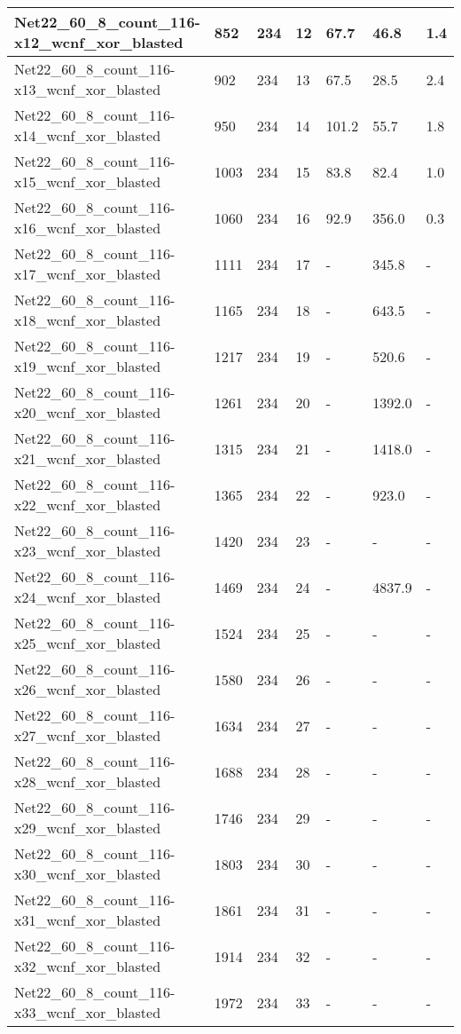 \begin{scriptsize}
\begin{longtable}{|p{5cm}|l|l|l|l|l|l|}
Net22\_60\_8\_count\_116-x12\_wcnf\_xor\_blasted&852&234&12&67.7&46.8&1.4 \\ \hline 
Net22\_60\_8\_count\_116-x13\_wcnf\_xor\_blasted&902&234&13&67.5&28.5&2.4 \\ \hline 
Net22\_60\_8\_count\_116-x14\_wcnf\_xor\_blasted&950&234&14&101.2&55.7&1.8 \\ \hline 
Net22\_60\_8\_count\_116-x15\_wcnf\_xor\_blasted&1003&234&15&83.8&82.4&1.0 \\ \hline 
Net22\_60\_8\_count\_116-x16\_wcnf\_xor\_blasted&1060&234&16&92.9&356.0&0.3 \\ \hline 
Net22\_60\_8\_count\_116-x17\_wcnf\_xor\_blasted&1111&234&17&-&345.8&- \\ \hline 
Net22\_60\_8\_count\_116-x18\_wcnf\_xor\_blasted&1165&234&18&-&643.5&- \\ \hline 
Net22\_60\_8\_count\_116-x19\_wcnf\_xor\_blasted&1217&234&19&-&520.6&- \\ \hline 
Net22\_60\_8\_count\_116-x20\_wcnf\_xor\_blasted&1261&234&20&-&1392.0&- \\ \hline 
Net22\_60\_8\_count\_116-x21\_wcnf\_xor\_blasted&1315&234&21&-&1418.0&- \\ \hline 
Net22\_60\_8\_count\_116-x22\_wcnf\_xor\_blasted&1365&234&22&-&923.0&- \\ \hline 
Net22\_60\_8\_count\_116-x23\_wcnf\_xor\_blasted&1420&234&23&-&-&- \\ \hline 
Net22\_60\_8\_count\_116-x24\_wcnf\_xor\_blasted&1469&234&24&-&4837.9&- \\ \hline 
Net22\_60\_8\_count\_116-x25\_wcnf\_xor\_blasted&1524&234&25&-&-&- \\ \hline 
Net22\_60\_8\_count\_116-x26\_wcnf\_xor\_blasted&1580&234&26&-&-&- \\ \hline 
Net22\_60\_8\_count\_116-x27\_wcnf\_xor\_blasted&1634&234&27&-&-&- \\ \hline 
Net22\_60\_8\_count\_116-x28\_wcnf\_xor\_blasted&1688&234&28&-&-&- \\ \hline 
Net22\_60\_8\_count\_116-x29\_wcnf\_xor\_blasted&1746&234&29&-&-&- \\ \hline 
Net22\_60\_8\_count\_116-x30\_wcnf\_xor\_blasted&1803&234&30&-&-&- \\ \hline 
Net22\_60\_8\_count\_116-x31\_wcnf\_xor\_blasted&1861&234&31&-&-&- \\ \hline 
Net22\_60\_8\_count\_116-x32\_wcnf\_xor\_blasted&1914&234&32&-&-&- \\ \hline 
Net22\_60\_8\_count\_116-x33\_wcnf\_xor\_blasted&1972&234&33&-&-&- \\ \hline 

\end{longtable}
\end{scriptsize}
